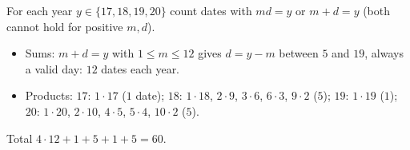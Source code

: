 For each year $y\in\{17,18,19,20\}$ count dates with $md=y$ or $m+d=y$ (both cannot hold for positive $m,d$).
\begin{itemize}
\item Sums: $m+d=y$ with $1\le m\le12$ gives $d=y-m$ between $5$ and $19$, always a valid day: $12$ dates each year.
\item Products: $17$: $1\cdot17$ ($1$ date); $18$: $1\cdot18$, $2\cdot9$, $3\cdot6$, $6\cdot3$, $9\cdot2$ ($5$); $19$: $1\cdot19$ ($1$); $20$: $1\cdot20$, $2\cdot10$, $4\cdot5$, $5\cdot4$, $10\cdot2$ ($5$).
\end{itemize}
Total $4\cdot12+1+5+1+5=\boxed{60}$.
